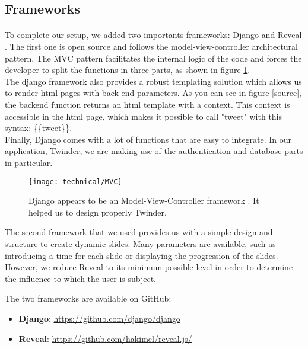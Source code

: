 \subsection{Frameworks}

\paragraph{}
To complete our setup, we added two importants frameworks: Django \cite{django} and Reveal \cite{reveal}. The first one is open source and follows the model-view-controller architectural pattern. The MVC pattern facilitates the internal logic of the code and forces the developer to split the functions in three parts, as shown in figure \ref{fig:MVC_design}. \\
The django framework also provides a robust templating solution which allows us to render html pages with back-end parameters. As you can see in figure [source], the backend function returns an html template with a context. This context is accessible in the html page, which makes it possible to call "tweet" with this syntax: \{\{tweet\}\}.\\
Finally, Django comes with a lot of functions that are easy to integrate. In our application, Twinder, we are making use of the authentication and database parts in particular.



\begin{figure}[h] 
\centering 
\texttt{[image: technical/MVC]} 
\caption[MVC model]{Django appears to be an Model-View-Controller framework \cite{mvc_django}. It helped us to design properly Twinder.}
\label{fig:MVC_design} 
\end{figure}

The second framework that we used provides us with a simple design and structure to create dynamic slides. Many parameters are available, such as introducing a time for each slide or displaying the progression of the slides. However, we reduce Reveal to its minimum possible level in order to determine the influence to which the user is subject.

The two frameworks are available on GitHub: 
\begin{itemize}
  \item \textbf{Django}: \url{https://github.com/django/django}
  \item \textbf{Reveal}: \url{https://github.com/hakimel/reveal.js/}
\end{itemize}

